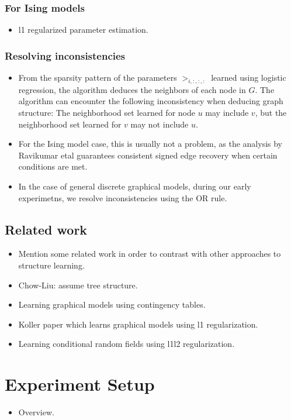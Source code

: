 \documentclass{article}
\begin{document}
\subsubsection{For Ising models}
\begin{itemize}
 \item l1 regularized parameter estimation.
\end{itemize}

\subsubsection{Resolving inconsistencies}
\begin{itemize}
 \item From the sparsity pattern of the parameters $\gt_{i, :, :, :}$ learned using logistic regression, the algorithm deduces the neighbors of each node in $G$. The algorithm can encounter the following inconsistency when deducing graph structure: The neighborhood set learned for node $u$ may include $v$, but the neighborhood set learned for $v$ may not include $u$.
 \item For the Ising model case, this is usually not a problem, as the analysis by Ravikumar etal guarantees consistent signed edge recovery when certain conditions are met.
 \item In the case of general discrete graphical models, during our early experimetns, we resolve inconsistencies using the OR rule.
\end{itemize}

\subsection{Related work}
\begin{itemize}
 \item Mention some related work in order to contrast with other approaches to structure learning.
 \item Chow-Liu: assume tree structure.
 \item Learning graphical models using contingency tables.
 \item Koller paper which learns graphical models using l1 regularization.
 \item Learning conditional random fields using l1l2 regularization.
\end{itemize}


\section{Experiment Setup}
\begin{itemize}
 \item Overview.
\end{itemize}
\end{document}
